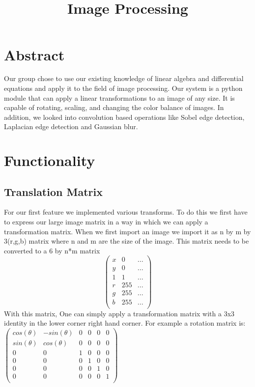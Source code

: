 \documentclass[11pt]{article}
\title{\textbf{Image Processing}}
\author{}
\date{}
\begin{document}
\maketitle

\section{Abstract}
Our group chose to use our existing knowledge of linear algebra and differential equations and apply it to the field of image processing. Our system is a python module that can apply a linear transformations to an image of any size. It is capable of rotating, scaling, and changing the color balance of images. In addition, we looked into convolution based operations like Sobel edge detection, Laplacian edge detection and Gaussian blur.

\section{Functionality}
\subsection{Translation Matrix}
For our first feature we implemented various transforms. To do this we first have to express our large image matrix in a way in which we can apply a transformation matrix. When we first import an image we import it as n by m by 3(r,g,b) matrix where n and m are the size of the image. This matrix needs to be converted to a 6 by n*m matrix
$$\begin{pmatrix}
	x & 0 & ...\\
	y & 0 & ...\\
	1 & 1 & ...\\
	r &  255 & ...\\
	g & 255 & ...\\
	b & 255 & ...\\
\end{pmatrix}$$
 With this matrix, One can simply apply a transformation matrix with a 3x3 identity in the lower corner right hand corner. For example a rotation matrix is:
 $\begin{pmatrix} 
	cos(\theta) & -sin(\theta) & 0 & 0 & 0 & 0\\
	sin(\theta) & cos(\theta) & 0 & 0 & 0 & 0\\
	0 & 0 & 1 & 0 & 0 & 0\\
	0 & 0 & 0 & 1 & 0 & 0\\
	0 & 0 & 0 & 0 & 1 & 0\\
	0 & 0 & 0 & 0 & 0 & 1\\
\end{pmatrix}$
\end{document}

